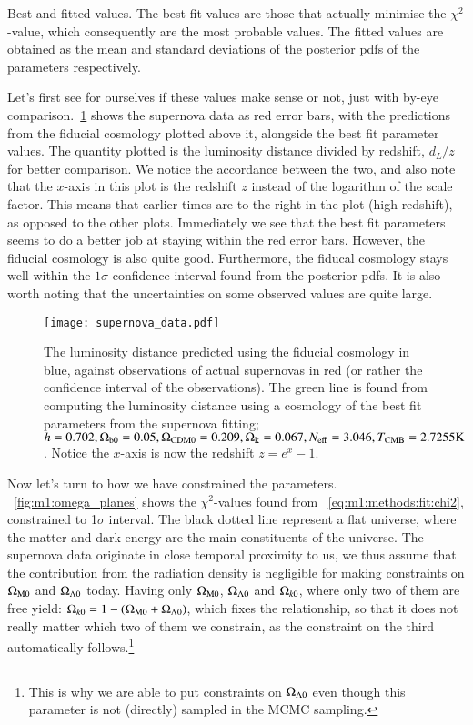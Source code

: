     \begin{table}
        
        \caption{Best and fitted values. The best fit values are those that actually minimise the $\chi^2$-value, which consequently are the most probable values. The fitted values are obtained as the mean and standard deviations of the posterior pdfs of the parameters respectively. }
        \label{tab:m1:best_fit_values}
    \end{table}
    Let's first see for ourselves if these values make sense or not, just with by-eye comparison.~\cref{fig:m1:supernova_data} shows the supernova data as red error bars, with the predictions from the fiducial cosmology plotted above it, alongside the best fit parameter values. The quantity plotted is the luminosity distance divided by redshift, $d_L/z$ for better comparison. We notice the accordance between the two, and also note that the $x$-axis in this plot is the redshift $z$ instead of the logarithm of the scale factor. This means that earlier times are to the right in the plot (high redshift), as opposed to the other plots. Immediately we see that the best fit parameters seems to do a better job at staying within the red error bars. However, the fiducial cosmology is also quite good. Furthermore, the fiducal cosmology stays well within the $1\sigma$ confidence interval found from the posterior pdfs. It is also worth noting that the uncertainties on some observed values are quite large. 

    \begin{figure}
        \texttt{[image: supernova\_data.pdf]}
        \caption{The luminosity distance predicted using the fiducial cosmology in blue, against observations of actual supernovas in red (or rather the confidence interval of the observations). The green line is found from computing the luminosity distance using a cosmology of the best fit parameters from the supernova fitting; $h=0.702, \Omega_\mathrm{b0} = 0.05, \Omega_\mathrm{CDM0} = 0.209, \Omega_\mathrm{k}=0.067, N_\mathrm{eff}=3.046, T_\mathrm{CMB}=2.7255 \text{K}$. Notice the $x$-axis is now the redshift $z=e^x-1$.}
        \label{fig:m1:supernova_data}
    \end{figure}

    Now let's turn to how we have constrained the parameters. ~\cref{fig:m1:omega_planes} shows the $\chi^2$-values found from ~\cref{eq:m1:methods:fit:chi2}, constrained to 1$\sigma$ interval. The black dotted line represent a flat universe, where the matter and dark energy are the main constituents of the universe. The supernova data originate in close temporal proximity to us, we thus assume that the contribution from the radiation density is negligible for making constraints on $\Omega_\mathrm{M0}$ and $\Omega_{\Lambda0}$ today. Having only $\Omega_\mathrm{M0}$, $\Omega_{\Lambda0}$ and $\Omega_{k0}$, where only two of them are free yield: $\Omega_{k0}=1-(\Omega_\mathrm{M0}+\Omega_{\Lambda0})$, which fixes the relationship, so that it does not really matter which two of them we constrain, as the constraint on the third automatically follows.\footnote{This is why we are able to put constraints on $\Omega_{\Lambda0}$ even though this parameter is not (directly) sampled in the MCMC sampling.}
    
